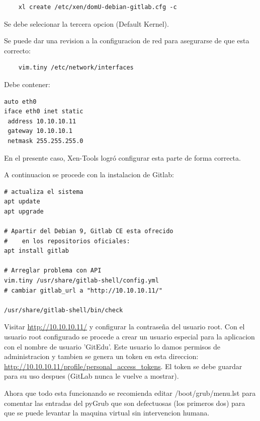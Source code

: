 \begin{lstlisting}
	xl create /etc/xen/domU-debian-gitlab.cfg -c
\end{lstlisting}

Se debe selecionar la tercera opcion (Default Kernel).

Se puede dar una revision a la configuracion de red para asegurarse de que esta correcto:

\begin{lstlisting}
	vim.tiny /etc/network/interfaces
\end{lstlisting}

Debe contener:

\begin{lstlisting}
auto eth0
iface eth0 inet static
 address 10.10.10.11
 gateway 10.10.10.1
 netmask 255.255.255.0
\end{lstlisting}

En el presente caso, Xen-Tools logró configurar esta parte de forma correcta.

A continuacion se procede con la instalacion de Gitlab:

\begin{lstlisting}
# actualiza el sistema
apt update
apt upgrade

# Apartir del Debian 9, Gitlab CE esta ofrecido
#    en los repositorios oficiales:
apt install gitlab

# Arreglar problema con API
vim.tiny /usr/share/gitlab-shell/config.yml
# cambiar gitlab_url a "http://10.10.10.11/"

/usr/share/gitlab-shell/bin/check
\end{lstlisting}

Visitar \url{http://10.10.10.11/} y configurar la contraseña del usuario root. Con el usuario root configurado se procede a crear un usuario especial para la aplicacion con el nombre de usuario 'GitEdu'. Este usuario lo damos permisos de administracion y tambien se genera un token en esta direccion: \url{http://10.10.10.11/profile/personal_access_tokens}. El token se debe guardar para su uso despues (GitLab nunca le vuelve a mostrar).

Ahora que todo esta funcionando se recomienda editar /boot/grub/menu.lst para comentar las entradas del pyGrub que son defectuosas (los primeros dos) para que se puede levantar la maquina virtual sin intervencion humana.




